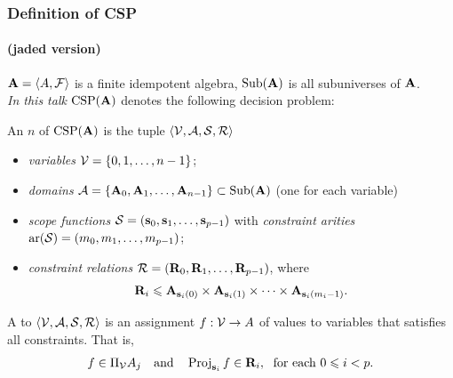 \documentclass[xcolor=dvipsnames,9pt,hide notes,mathserif]{beamer}
\renewcommand{\alert}[1]{\textcolor{olivegreen}{#1}}
\renewcommand{\emph}[1]{\alert{{\it #1}}}
\begin{document}
\begin{frame}
  \frametitle{Definition of CSP}
  \framesubtitle{(jaded version)}

  $\mathbf{A} = \langle A, \mathcal{F}\rangle$ is a finite idempotent algebra,
  $\mbox{Sub}(\mathbf{A})$ is all subuniverses of $\mathbf{A}$. \\[4pt]

  {\it In this talk} $\operatorname{CSP}(\mathbf{A})$ denotes the following decision problem:

  \bigskip
  
  An  $n$ of $\operatorname{CSP}(\mathbf{A})$ is the tuple $\langle\mathcal{V}, \mathcal{A}, \mathcal{S}, \mathcal{R}\rangle$ 
  \begin{itemize}
  \item \emph{variables} $\mathcal{V} = \{0, 1, \dots, n-1\}$;\\[4pt]
  \item \emph{domains} $\mathcal{A} = \{\mathbf{A}_0, \mathbf{A}_1, \dots, \mathbf{A}_{n-1}\} \subset \mbox{Sub}(\mathbf{A})$  (one for each variable)\\[4pt]
  \item \emph{scope functions} $\mathcal{S} = (\mathbf{s}_0, \mathbf{s}_1, \dots, \mathbf{s}_{p-1})$ 
    with \emph{constraint arities} $\operatorname{ar}(\mathcal{S}) = (m_0, m_1, \dots, m_{p-1})$;\\[4pt]
  \item \emph{constraint relations} $\mathcal{R} = (\mathbf{R}_0, \mathbf{R}_1, \dots, \mathbf{R}_{p-1})$, where
    \[\mathbf{R}_i \leqslant \mathbf{A}_{\mathbf{s}_i(0)} \times \mathbf{A}_{\mathbf{s}_i(1)}\times \cdots \times \mathbf{A}_{\mathbf{s}_i(m_i-1)}.\]
  \end{itemize}
  
  \bigskip
  
  A  to $\langle\mathcal{V}, \mathcal{A}, \mathcal{S}, \mathcal{R}\rangle$ is an assignment
  $f: \mathcal{V} \to A$ of values to variables that satisfies all constraints. That is,
  \[f\in \Pi_{\mathcal{V}}A_j
  \quad  \text{and} \quad 
  \operatorname{Proj}_{\mathbf{s}_i} f \in \mathbf{R}_i, \;\text{ for each $0\leqslant i < p$.}\]

\end{frame}
\end{document}
